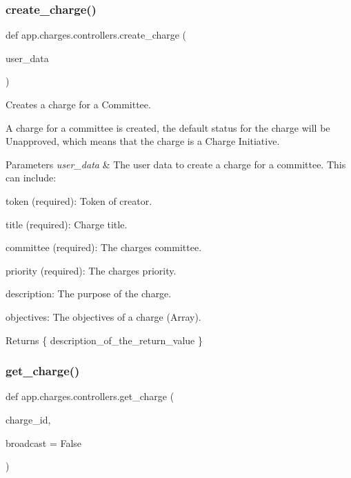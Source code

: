 \subsubsection{\texorpdfstring{create\+\_\+charge()}{create\_charge()}}
{\footnotesize\ttfamily def app.\+charges.\+controllers.\+create\+\_\+charge (\begin{DoxyParamCaption}\item[{}]{user\+\_\+data }\end{DoxyParamCaption})}



Creates a charge for a Committee. 

A charge for a committee is created, the default status for the charge will be Unapproved, which means that the charge is a Charge Initiative.


\begin{DoxyParams}{Parameters}
{\em user\+\_\+data} & The user data to create a charge for a committee. This can include\+:\\
\hline
\end{DoxyParams}

\begin{DoxyItemize}
\item token (required)\+: Token of creator.
\item title (required)\+: Charge title.
\item committee (required)\+: The charge\textquotesingle{}s committee.
\item priority (required)\+: The charge\textquotesingle{}s priority.
\item description\+: The purpose of the charge.
\item objectives\+: The objectives of a charge (Array).
\end{DoxyItemize}

\begin{DoxyReturn}{Returns}
\{ description\+\_\+of\+\_\+the\+\_\+return\+\_\+value \} 
\end{DoxyReturn}
\mbox{\label{namespaceapp_1_1charges_1_1controllers_acde694db95925313933db3ab5ebc3ad0}} 
\subsubsection{\texorpdfstring{get\+\_\+charge()}{get\_charge()}}
{\footnotesize\ttfamily def app.\+charges.\+controllers.\+get\+\_\+charge (\begin{DoxyParamCaption}\item[{}]{charge\+\_\+id,  }\item[{}]{broadcast = {\ttfamily False} }\end{DoxyParamCaption})}



